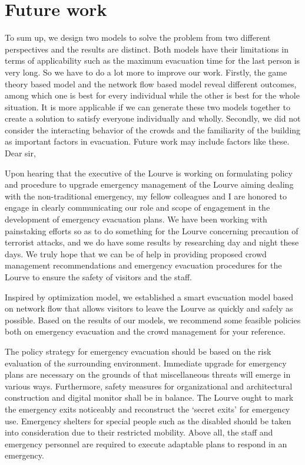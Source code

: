 \documentclass{mcmthesis}
\begin{document}
\section{Future work}

To sum up, we design two models to solve the problem from two different perspectives and the results are distinct. Both models have their limitations in terms of applicability such as the maximum evacuation time for the last person is very long. So we have to do a lot more to improve our work.
Firstly, the game theory based model and the network flow based model reveal different outcomes, among which one is best for every individual while the other is best for the whole situation. It is more applicable if we can generate these two models together to create a solution to satisfy everyone individually and wholly.
Secondly, we did not consider the interacting behavior of the crowds and the familiarity of the building as important factors in evacuation. Future work may include  factors like these.
\newpage
Dear sir,

Upon hearing that the executive of the Lourve is working on formulating policy and procedure to upgrade emergency management of the Lourve aiming dealing with the non-traditional emergency, my fellow colleagues and I are honored to engage in clearly communicating our role and scope of engagement in the development of emergency evacuation plans. We have been working with painstaking efforts so as to do something for the Lourve concerning precaution of terrorist attacks, and we do have some results by researching day and night these days. We truly hope that we can be of help in providing proposed crowd management recommendations and emergency evacuation procedures for the Lourve to ensure the safety of visitors and the staff.

Inspired by optimization model, we established a smart evacuation model based on network flow that allows visitors to leave the Lourve as quickly and safely as possible. Based on the results of our models, we recommend some feasible policies both on emergency evacuation and the crowd management for your reference.

The policy strategy for emergency evacuation should be based on the risk evaluation of the surrounding environment. Immediate upgrade for emergency plans are necessary on the grounds of that miscellaneous threats will emerge in various ways. Furthermore, safety measures for organizational and architectural construction and digital monitor shall be in balance. The Lourve ought to mark the emergency exits noticeably and reconstruct the ‘secret exits’ for emergency use. Emergency shelters for special people such as the disabled should be taken into consideration due to their restricted mobility. Above all, the staff and emergency personnel are required to execute adaptable plans to respond in an emergency.
\end{document}
